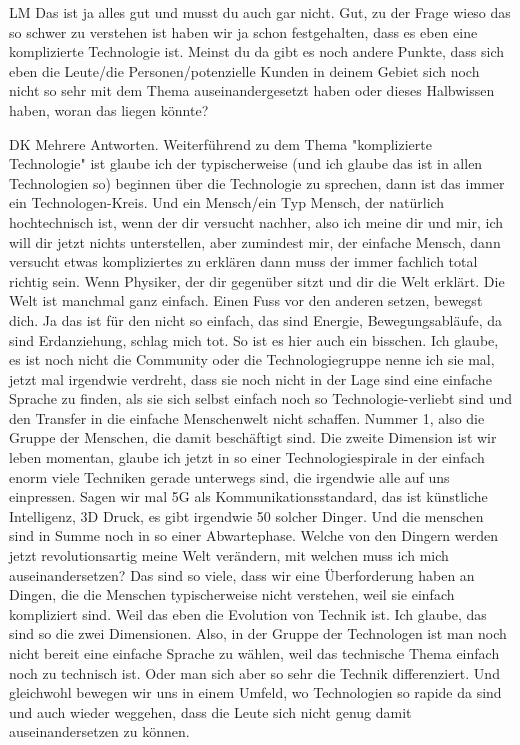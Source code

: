 \begin{xlist}
     \item[LM] Das ist ja alles gut und musst du auch gar nicht. Gut, zu der Frage wieso das so schwer zu verstehen ist haben wir ja schon festgehalten, dass es eben eine komplizierte Technologie ist. Meinst du da gibt es noch andere Punkte, dass sich eben die Leute/die Personen/potenzielle Kunden in deinem Gebiet sich noch nicht so sehr mit dem Thema auseinandergesetzt haben oder dieses Halbwissen haben, woran das liegen könnte?
     \item[DK] Mehrere Antworten. Weiterführend zu dem Thema "komplizierte Technologie" ist glaube ich der typischerweise  (und ich glaube das ist in allen Technologien so) beginnen über die Technologie zu sprechen, dann ist das immer ein Technologen-Kreis. Und ein Mensch/ein Typ Mensch, der natürlich hochtechnisch ist, wenn der dir versucht nachher, also ich meine dir und mir, ich will dir jetzt nichts unterstellen, aber zumindest mir, der einfache Mensch, dann versucht etwas kompliziertes zu erklären dann muss der immer fachlich total richtig sein. Wenn Physiker, der dir gegenüber sitzt und dir die Welt erklärt. Die Welt ist manchmal ganz einfach. Einen Fuss vor den anderen setzen, bewegst dich. Ja das ist für den nicht so einfach, das sind Energie, Bewegungsabläufe, da sind Erdanziehung, schlag mich tot. So ist es hier auch ein bisschen. Ich glaube, es ist noch nicht die Community oder die Technologiegruppe nenne ich sie mal, jetzt mal irgendwie verdreht, dass sie noch nicht in der Lage  sind eine einfache Sprache zu finden, als sie sich selbst einfach noch so Technologie-verliebt sind und den Transfer in die einfache Menschenwelt nicht schaffen. Nummer 1, also die Gruppe der Menschen, die damit beschäftigt sind. Die zweite Dimension ist wir leben momentan, glaube ich jetzt in so einer Technologiespirale in der einfach enorm viele Techniken gerade unterwegs sind, die irgendwie alle auf uns einpressen. Sagen wir mal 5G als Kommunikationsstandard, das ist künstliche Intelligenz, 3D Druck, es gibt irgendwie 50 solcher Dinger. Und die menschen sind in Summe noch in so einer Abwartephase. Welche von den Dingern werden jetzt revolutionsartig meine Welt verändern, mit welchen muss ich mich auseinandersetzen? Das sind so viele, dass wir eine Überforderung haben an Dingen, die die Menschen typischerweise nicht verstehen, weil sie einfach kompliziert sind. Weil das eben die Evolution von Technik ist. Ich glaube, das sind so die zwei Dimensionen. Also, in der Gruppe der Technologen ist man noch nicht bereit eine einfache Sprache zu wählen, weil das technische Thema einfach noch zu technisch ist. Oder man sich aber so sehr die Technik differenziert. Und gleichwohl bewegen wir uns in einem Umfeld, wo Technologien so rapide da sind und auch wieder weggehen, dass die Leute sich nicht genug damit auseinandersetzen zu können.

\end{xlist}
